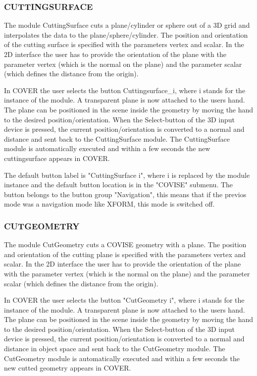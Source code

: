 \subsubsection{CUTTINGSURFACE}
The module CuttingSurface cuts a plane/cylinder or sphere out of a 
3D grid and interpolates the data to the plane/sphere/cylinder.
The position and orientation of the cutting surface is specified with the
parameters vertex and scalar. In the 2D interface the user has to provide
the orientation of the plane with the parameter vertex (which is the normal
on the plane) and the parameter scalar (which defines the distance from the
origin).

In COVER the user selects the button Cuttingsurface\_i, where i stands for
the instance of the module. A transparent plane is now attached to
the users hand. The plane can be positioned in the scene inside the geometry
by moving the hand to the desired position/orientation. When the Select-button
of the 3D input device is pressed, the current position/orientation is converted
to a normal and distance and sent back to the CuttingSurface module. The
CuttingSurface module is automatically executed and within a few seconds
the new cuttingsurface appears in COVER.

The default button label is "CuttingSurface i", where i is replaced
by the module instance and
the default button location is in the "COVISE" submenu.
The button belongs to the button group "Navigation", this means that if the
previos mode was a navigation mode like XFORM, this mode is switched off. 

\subsubsection{CUTGEOMETRY}
The module CutGeometry cuts a COVISE geometry with a plane.
The position and orientation of the cutting plane is specified with the
parameters vertex and scalar. In the 2D interface the user has to provide
the orientation of the plane with the parameter vertex (which is the normal
on the plane) and the parameter scalar (which defines the distance from the
origin).

In COVER the user selects the button "CutGeometry i", where i stands for
the instance of the module. A transparent plane is now attached to
the users hand. The plane can be positioned in the scene inside the geometry
by moving the hand to the desired position/orientation. When the Select-button
of the 3D input device is pressed, the current position/orientation is converted
to a normal and distance in object space and sent back to the CutGeometry module. 
The CutGeometry module is automatically executed and within a few seconds
the new cutted geometry appears in COVER.

